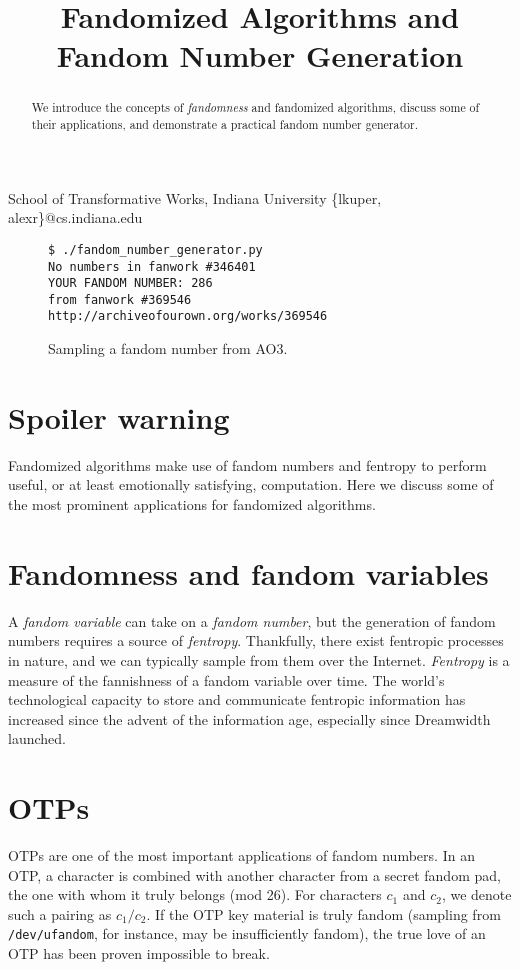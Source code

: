 \documentclass[9pt]{sigplanconf}
\begin{document}
\title{Fandomized Algorithms and Fandom Number Generation}

           {School of Transformative Works, Indiana University}
           {\{lkuper, alexr\}@cs.indiana.edu}

\maketitle

\begin{abstract}
We introduce the concepts of \emph{fandomness} and fandomized algorithms,
discuss some of their applications, and demonstrate a practical fandom number
generator.
\end{abstract}


\begin{figure}[bl]
\begin{verbatim}
$ ./fandom_number_generator.py 
No numbers in fanwork #346401
YOUR FANDOM NUMBER: 286
from fanwork #369546
http://archiveofourown.org/works/369546
\end{verbatim}
\caption{Sampling a fandom number from AO3.}
\end{figure}

\section{Spoiler warning}
Fandomized algorithms make use of fandom numbers and fentropy to
perform useful, or at least emotionally satisfying, computation. Here
we discuss some of the most prominent applications for fandomized
algorithms.

\section{Fandomness and fandom variables}
A \emph{fandom variable} can take on a \emph{fandom number}, but the
generation of fandom numbers requires a source of
\emph{fentropy}. Thankfully, there exist fentropic processes in
nature, and we can typically sample from them over the
Internet. \emph{Fentropy} is a measure of the fannishness of a fandom
variable over time.  The world's technological capacity to store and
communicate fentropic information has increased since the advent of
the information age, especially since Dreamwidth launched.

\section{OTPs}
OTPs are one of the most important applications of fandom numbers.  In
an OTP, a character is combined with another character from a secret
fandom pad, the one with whom it truly belongs (mod 26).  For
characters $c_1$ and $c_2$, we denote such a pairing as $c_1/c_2$.  If
the OTP key material is truly fandom (sampling from {\tt
  /dev/ufandom}, for instance, may be insufficiently fandom), the true
love of an OTP has been proven impossible to break.
\end{document}
